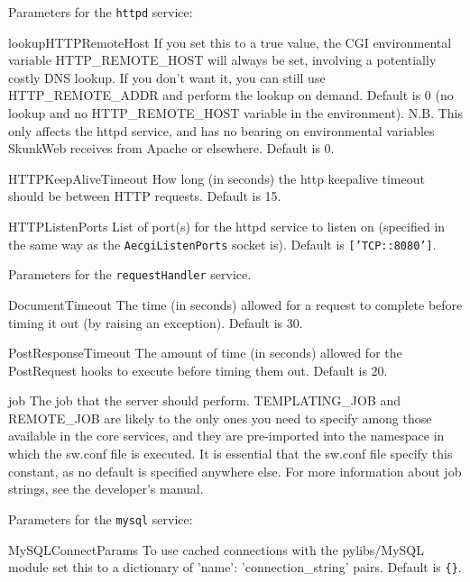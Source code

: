 \documentclass[titlepage]{manual}
\begin{document}
Parameters for the \texttt{httpd} service:
\begin{argdesc}
\item[lookupHTTPRemoteHost] \nonscope
If you set this to a true value, the CGI environmental variable
HTTP_REMOTE_HOST will always be set, involving a potentially costly DNS
lookup.  If you don't want it, you can still use HTTP_REMOTE_ADDR and
perform the lookup on demand.  Default is 0 (no lookup and no HTTP_REMOTE_HOST
variable in the environment).
N.B. This only affects the httpd service, and has no bearing on environmental
variables SkunkWeb receives from Apache or elsewhere.
Default is 0.
\item[HTTPKeepAliveTimeout] \nonscope
How long (in seconds) the http keepalive timeout should be between
HTTP requests.
Default is 15.
\item[HTTPListenPorts] \nonscope
List of port(s) for the httpd service to listen on (specified in the same
way as the \texttt{AecgiListenPorts} socket is).
Default is \texttt{['TCP::8080']}.
\end{argdesc}



Parameters for the \texttt{requestHandler} service.
\begin{argdesc}
\item[DocumentTimeout]
The time (in seconds) allowed for a request to complete before timing
it out (by raising an exception).
Default is 30.
\item[PostResponseTimeout]
The amount of time (in seconds) allowed for the PostRequest hooks to
execute before timing them out.
Default is 20.
\item[job] 
The job that the server should perform.  TEMPLATING_JOB and REMOTE_JOB 
are likely to the only ones you need to specify among those available in
the core services, and they are pre-imported into the namespace in which
the sw.conf file is executed.  It is essential that the sw.conf file
specify this constant, as no default is specified anywhere else.
For more information about job strings, see the developer's manual.
\end{argdesc}



Parameters for the \texttt{mysql} service:
\begin{argdesc}
\item[MySQLConnectParams] \nonscope
To use cached connections with the pylibs/MySQL module set this to
a dictionary of 'name': 'connection\_string' pairs.
Default is \texttt{\{\}}.
\end{argdesc}
\end{document}
